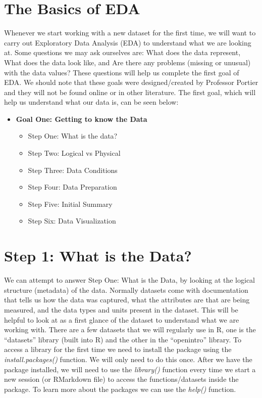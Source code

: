 \documentclass[
  letterpaper,
  DIV=11,
  numbers=noendperiod]{scrreprt}
\providecommand{\tightlist}{%
  \setlength{\itemsep}{0pt}\setlength{\parskip}{0pt}}
\begin{document}
\section{The Basics of EDA}\label{the-basics-of-eda}

Whenever we start working with a new dataset for the first time, we will
want to carry out Exploratory Data Analysis (EDA) to understand what we
are looking at. Some questions we may ask ourselves are: What does the
data represent, What does the data look like, and Are there any problems
(missing or unusual) with the data values? These questions will help us
complete the first goal of EDA. We should note that these goals were
designed/created by Professor Portier and they will not be found online
or in other literature. The first goal, which will help us understand
what our data is, can be seen below:

\begin{itemize}
\tightlist
\item
  \textbf{Goal One: Getting to know the Data}

  \begin{itemize}
  \tightlist
  \item
    Step One: What is the data?
  \item
    Step Two: Logical vs Physical
  \item
    Step Three: Data Conditions
  \item
    Step Four: Data Preparation
  \item
    Step Five: Initial Summary
  \item
    Step Six: Data Visualization
  \end{itemize}
\end{itemize}

\section{Step 1: What is the Data?}\label{step-1-what-is-the-data}

We can attempt to answer Step One: What is the Data, by looking at the
logical structure (metadata) of the data. Normally datasets come with
documentation that tells us how the data was captured, what the
attributes are that are being measured, and the data types and units
present in the dataset. This will be helpful to look at as a first
glance of the dataset to understand what we are working with. There are
a few datasets that we will regularly use in R, one is the ``datasets''
library (built into R) and the other in the ``openintro'' library. To
access a library for the first time we need to install the package using
the \emph{install.packages()} function. We will only need to do this
once. After we have the package installed, we will need to use the
\emph{library()} function every time we start a new session (or
RMarkdown file) to access the functions/datasets inside the package. To
learn more about the packages we can use the \emph{help()} function.
\end{document}
